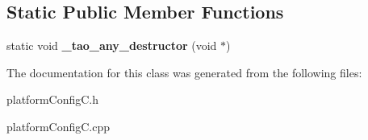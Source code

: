 \subsection*{Static Public Member Functions}
\begin{DoxyCompactItemize}
\item 
static void {\bfseries \+\_\+tao\+\_\+any\+\_\+destructor} (void $\ast$)\label{classplatformConfig_1_1platformConfigLogLevels_af491dd3f9e250f36a221e8ea90328293}

\end{DoxyCompactItemize}


The documentation for this class was generated from the following files\+:\begin{DoxyCompactItemize}
\item 
platform\+Config\+C.\+h\item 
platform\+Config\+C.\+cpp\end{DoxyCompactItemize}
